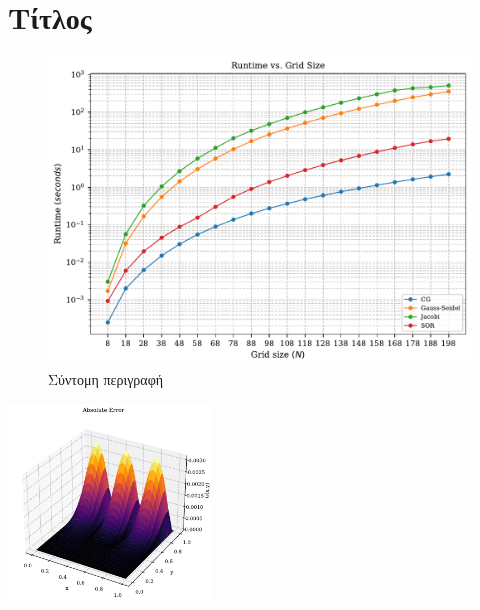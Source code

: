 \section{Τίτλος}

\begin{figure}[!ht]
    \centering
    \includegraphics[width=0.50\linewidth]{doc/figures/runtime_gridsize.pdf}
    \caption{Σύντομη περιγραφή}
    \label{fig:placeholder}
\end{figure}

\begin{image}
    \centering
    \includegraphics[width=0.40\textwidth]{doc/images/abs_error_surface.pdf}
    \caption{Σύντομη περιγραφή}
    \label{img:example}
\end{image}


